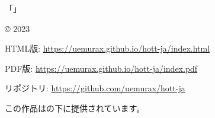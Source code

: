 \documentclass[b5paper]{ltjsbook}
\title{\myTitle}
\author{\myAuthor}
\begin{document}
\frontmatter

\maketitle                      %

\pagebreak
\hspace{0pt}
\vfill
\noindent 「\myTitle」
\par\noindent \copyright{} 2023 \myAuthor
\par\vspace{1em}
\noindent HTML版: \url{https://uemurax.github.io/hott-ja/index.html}
\par\noindent PDF版: \url{https://uemurax.github.io/hott-ja/index.pdf}
\par\noindent リポジトリ: \url{https://github.com/uemurax/hott-ja}
\par\vspace{1em}
\noindent この作品はの下に提供されています。
\vfill
\hspace{0pt}
\thispagestyle{empty}
\pagebreak


\tableofcontents                %
\listoffigures

\mainmatter



\backmatter

\myPrintBibliography

\myPrintIndex

\myPrintNodeIndex
\end{document}
